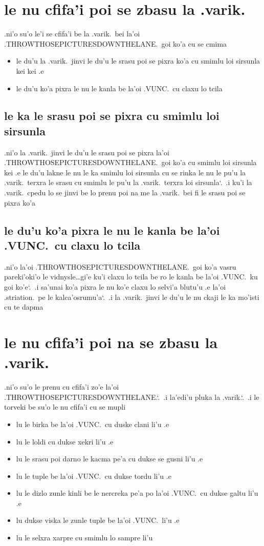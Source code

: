 \documentclass{report}
\newcommand\sds{\spacefactor\sfcode`.\ \space}
\begin{document}
\section{le nu cfifa'i poi se zbasu la .varik.}
.ni'o su'o le'i se cfifa'i be la .varik.\ bei la'oi .THROWTHOSEPICTURESDOWNTHELANE.\ goi ko'a cu se cmima
\begin{itemize}
	\item le du'u la .varik.\ jinvi le du'u le srasu poi se pixra ko'a cu smimlu loi sirsunla kei kei .e
	\item le du'u ko'a pixra le nu le kanla be la'oi .VUNC.\ cu claxu lo tcila
\end{itemize}

\subsection{le ka le srasu poi se pixra cu smimlu loi sirsunla}
.ni'o la .varik.\ jinvi le du'u le srasu poi se pixra la'oi .THROWTHOSEPICTURESDOWNTHELANE.\ goi ko'a cu smimlu loi sirsunla kei .e le du'u lakne le nu le ka smimlu loi sirsunla cu se rinka le nu le pu'u la .varik.\ terxra le srasu cu smimlu le pu'u la .varik.\ terxra loi sirsunla\sds  .i ku'i la .varik.\ cpedu lo se jinvi be lo prenu poi na me la .varik.\ bei fi le srasu poi se pixra ko'a

\subsection{le du'u ko'a pixra le nu le kanla be la'oi .VUNC.\ cu claxu lo tcila}
.ni'o la'oi .THROWTHOSEPICTURESDOWNTHELANE.\ goi ko'a vasru pareki'oki'o le vidnysle\ldots gi'e ku'i claxu lo tcila be ro le kanla be la'oi .VUNC.\ ku goi ko'e\sds  .i sa'unai ko'a pixra le nu ko'e claxu lo selvi'a blutu'u .e la'oi .striation.\ pe le kalca'osrumu'a\sds  .i la .varik.\ jinvi le du'u le nu ckaji le ka mo'isti cu te dapma

\section{le nu cfifa'i poi na se zbasu la .varik.}
.ni'o su'o le prenu cu cfifa'i zo'e la'oi .THROWTHOSEPICTURESDOWNTHELANE.\sds  .i la'edi'u pluka la .varik.\sds  .i le torveki be su'o le nu cfifa'i cu se mupli
\begin{itemize}
	\item lu le birka be la'oi .VUNC.\ cu duske clani li'u .e
	\item lu le loldi cu dukse xekri li'u .e
	\item lu le srasu poi darno le kacma pe'a cu dukse se gusni li'u .e
	\item lu le tuple be la'oi .VUNC.\ cu dukse tordu li'u .e
	\item lu le dizlo zunle kinli be le nercreka pe'a po la'oi .VUNC.\ cu dukse galtu li'u .e
	\item lu dukse viska le zunle tuple be la'oi .VUNC.\ li'u .e
	\item lu le selxra xarpre cu smimlu lo sampre li'u
\end{itemize}
\end{document}
